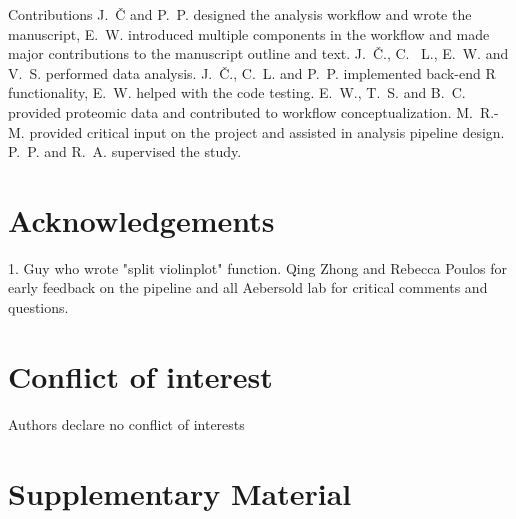 \documentclass[num-refs]{wiley-article}
\newcommand{\beginsupplement}{%
	\setcounter{table}{0}
	\renewcommand{\thetable}{S\arabic{table}}%
	\setcounter{figure}{0}
	\renewcommand{\thefigure}{S\arabic{figure}}%
}
\begin{document}
Contributions
J.~Č and P.~P. designed the analysis workflow and wrote the manuscript, E.~W. introduced multiple components in the workflow and made major contributions to the manuscript outline and text. J.~Č., C. ~L., E.~W. and V.~S. performed data analysis. J.~Č., C.~L. and P.~P. implemented back-end R functionality, E.~W. helped with the code testing. E.~W., T.~S. and B.~C. provided proteomic data and contributed to workflow conceptualization. M.~R.-M. provided critical input on the project and assisted in analysis pipeline design. P.~P. and R.~A. supervised the study.

\section*{Acknowledgements}
1. Guy who wrote "split violinplot" function. Qing Zhong and Rebecca Poulos for early feedback on the pipeline and all Aebersold lab for critical comments and questions.

\section*{Conflict of interest}
Authors declare no conflict of interests


\printendnotes




\newpage
\section{Supplementary Material}
\beginsupplement
\end{document}
